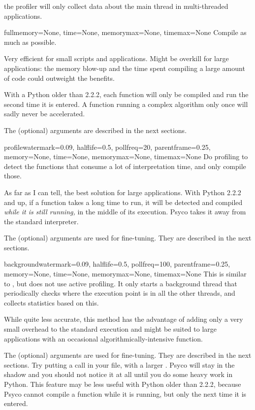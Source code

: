 \documentclass{manual}
\begin{document}
 the profiler will only collect data about the main thread in multi-threaded applications.

\begin{funcdesc}{full}{memory=None, time=None, memorymax=None, timemax=None}
  Compile as much as possible.

  Very efficient for small scripts and applications.  Might be overkill for large applications: the memory blow-up and the time spent compiling a large amount of code could outweight the benefits.

  With a Python older than 2.2.2, each function will only be compiled and run the second time it is entered.  A function running a complex algorithm only once will sadly never be accelerated.

  The (optional) arguments are described in the next sections.
\end{funcdesc}

\begin{funcdesc}{profile}{watermark=0.09, halflife=0.5, pollfreq=20, parentframe=0.25, memory=None, time=None, memorymax=None, timemax=None}
  Do profiling to detect the functions that consume a lot of interpretation time, and only compile those.

  As far as I can tell, the best solution for large applications.  With Python 2.2.2 and up, if a function takes a long time to run, it will be detected and compiled \emph{while it is still running,} in the middle of its execution.  Psyco takes it away from the standard interpreter.

  The (optional) arguments are used for fine-tuning.  They are described in the next sections.
\end{funcdesc}

\begin{funcdesc}{background}{watermark=0.09, halflife=0.5, pollfreq=100, parentframe=0.25, memory=None, time=None, memorymax=None, timemax=None}
  This is similar to , but does not use active profiling.  It only starts a background thread that periodically checks where the execution point is in all the other threads, and collects statistics based on this.

  While quite less accurate, this method has the advantage of adding only a very small overhead to the standard execution and might be suited to large applications with an occasional algorithmically-intensive function.

  The (optional) arguments are used for fine-tuning.  They are described in the next sections.  Try putting a  call in your  file, with a larger .  Psyco will stay in the shadow and you should not notice it at all until you do some heavy work in Python.  This feature may be less useful with Python older than 2.2.2, because Psyco cannot compile a function while it is running, but only the next time it is entered.
\end{funcdesc}
\end{document}
